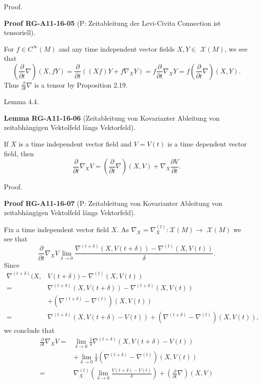 \documentclass[10pt, letterpaper]{article}
\newcommand{\CustomHeading}[3]{%
  \par\medskip\noindent%
  \textbf{#1 #2} \textnormal{(#3)}.\enskip%
}
\newenvironment{LEM}[2]{\begin{unitbox}\CustomHeading{Lemma}{#1}{#2}}{\end{unitbox}}
\newenvironment{PROOF}[2]{\begin{unitbox}\CustomHeading{Proof}{#1}{#2}}{\end{unitbox}}
\begin{document}
Proof. 

\begin{PROOF}{RG-A11-16-05}{P: Zeitableitung der Levi-Civita Connection ist tensoriell}
For $f \in C^{\infty}(M)$ and any time independent vector fields $X, Y \in$ $\mathscr{X}(M)$, we see that
$$
\left(\frac{\partial}{\partial t} \nabla\right)(X, f Y)=\frac{\partial}{\partial t}\left((X f) Y+f \nabla_{X} Y\right)=f \frac{\partial}{\partial t} \nabla_{X} Y=f\left(\frac{\partial}{\partial t} \nabla\right)(X, Y) .
$$
Thus $\frac{\partial}{\partial t} \nabla$ is a tensor by Proposition 2.19.
\end{PROOF}


Lemma 4.4. 

\begin{LEM}{RG-A11-16-06}{Zeitableitung von Kovarianter Ableitung von zeitabhängigen Vektolfeld längs Vektorfeld}
If $X$ is a time independent vector field and $V=V(t)$ is a time dependent vector field, then
$$
\frac{\partial}{\partial t} \nabla_{X} V=\left(\frac{\partial}{\partial t} \nabla\right)(X, V)+\nabla_{X} \frac{\partial V}{\partial t} .
$$
\end{LEM}

Proof. 

\begin{PROOF}{RG-A11-16-07}{P: Zeitableitung von Kovarianter Ableitung von zeitabhängigen Vektolfeld längs Vektorfeld}
Fix a time independent vector field $X$. As $\nabla_{X}=\nabla_{X}^{(t)}: \mathscr{X}(M) \rightarrow$ $\mathscr{X}(M)$ we see that
$$
\frac{\partial}{\partial t} \nabla_{X} V \lim _{\delta \rightarrow 0} \frac{\nabla^{(t+\delta)}(X, V(t+\delta))-\nabla^{(t)}(X, V(t))}{\delta} .
$$
Since
$$
\begin{aligned}
\nabla^{(t+\delta)}(X, & V(t+\delta))-\nabla^{(t)}(X, V(t)) \\
= & \nabla^{(t+\delta)}(X, V(t+\delta))-\nabla^{(t+\delta)}(X, V(t)) \\
& +\left(\nabla^{(t+\delta)}-\nabla^{(t)}\right)(X, V(t)) \\
= & \nabla^{(t+\delta)}(X, V(t+\delta)-V(t))+\left(\nabla^{(t+\delta)}-\nabla^{(t)}\right)(X, V(t)),
\end{aligned}
$$
we conclude that
$$
\begin{aligned}
\frac{\partial}{\partial t} \nabla_{X} V= & \lim _{\delta \rightarrow 0} \frac{1}{\delta} \nabla^{(t+\delta)}(X, V(t+\delta)-V(t)) \\
& +\lim _{\delta \rightarrow 0} \frac{1}{\delta}\left(\nabla^{(t+\delta)}-\nabla^{(t)}\right)(X, V(t)) \\
= & \nabla_{X}^{(t)}\left(\lim _{\delta \rightarrow 0} \frac{V(t+\delta)-V(t)}{\delta}\right)+\left(\frac{\partial}{\partial t} \nabla\right)(X, V)
\end{aligned}
$$
\end{PROOF}
\end{document}
